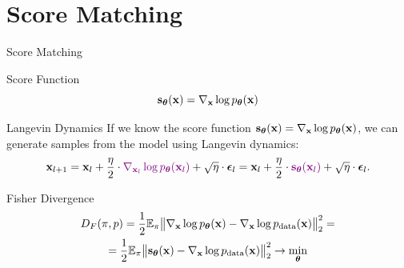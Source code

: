 \documentclass{beamer}
\begin{document}
\section{Score Matching}
\begin{frame}{Score Matching}
	\begin{block}{Score Function}
		\vspace{-0.3cm}
		 \[
			 \mathbf{s}_{\boldsymbol{\theta}}(\mathbf{x}) = \nabla_{\mathbf{x}}\log p_{\boldsymbol{\theta}}(\mathbf{x})
		 \]
		\vspace{-0.5cm}
	\end{block}
	\eqpause
	\begin{block}{Langevin Dynamics}
		If we know the score function $\mathbf{s}_{\boldsymbol{\theta}}(\mathbf{x}) = \nabla_{\mathbf{x}}\log p_{\boldsymbol{\theta}}(\mathbf{x})$, we can generate samples from the model using Langevin dynamics:
		\[
			\mathbf{x}_{l + 1} = \mathbf{x}_l + \frac{\eta}{2} \cdot {\color{violet}\nabla_{\mathbf{x}_l} \log p_{\boldsymbol{\theta}}(\mathbf{x}_l)} + \sqrt{\eta} \cdot \boldsymbol{\epsilon}_l = \mathbf{x}_l + \frac{\eta}{2} \cdot {\color{violet}\mathbf{s}_{\boldsymbol{\theta}}(\mathbf{x}_l)} + \sqrt{\eta} \cdot \boldsymbol{\epsilon}_l.
		\]
		\vspace{-0.5cm}
	\end{block}
	\eqpause
	\begin{block}{Fisher Divergence}
		\vspace{-0.5cm}
		\begin{multline*}
			D_F(\pi, p) = \frac{1}{2}\mathbb{E}_{\pi}\big\| \nabla_{\mathbf{x}}\log p_{\boldsymbol{\theta}}(\mathbf{x}) - \nabla_{\mathbf{x}} \log p_{\text{data}}(\mathbf{x}) \big\|^2_2 =\\
			= \frac{1}{2}\mathbb{E}_{\pi}\big\| \mathbf{s}_{\boldsymbol{\theta}}(\mathbf{x}) - \nabla_{\mathbf{x}} \log p_{\text{data}}(\mathbf{x}) \big\|^2_2 \rightarrow \min_{\boldsymbol{\theta}}
		\end{multline*}
		\vspace{-0.3cm}
	\end{block}
\end{frame}
\end{document}
